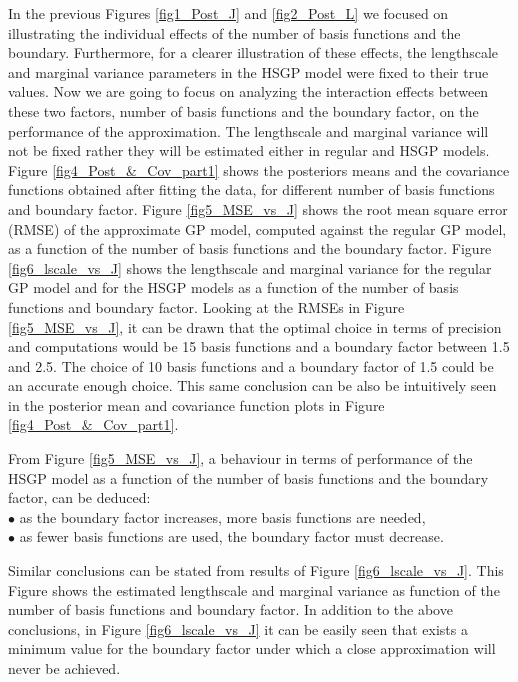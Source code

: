 \documentclass[]{interact}
\theoremstyle{plain}%
\theoremstyle{definition}
\theoremstyle{remark}
\begin{document}
In the previous Figures \ref{fig1_Post_J} and \ref{fig2_Post_L} we focused on illustrating the individual effects of the number of basis functions and the boundary. Furthermore, for a clearer illustration of these effects, the lengthscale and marginal variance parameters in the HSGP model were fixed to their true values. Now we are going to focus on analyzing the interaction effects between these two factors, number of basis functions and the boundary factor, on the performance of the approximation. The lengthscale and marginal variance will not be fixed rather they will be estimated either in regular and HSGP models.  
Figure \ref{fig4_Post_&_Cov_part1} shows the posteriors means and the covariance functions obtained after fitting the data, for different number of basis functions and boundary factor. Figure \ref{fig5_MSE_vs_J} shows the root mean square error (RMSE) of the approximate GP model, computed against the regular GP model, as a function of the number of basis functions and the boundary factor. Figure \ref{fig6_lscale_vs_J} shows the lengthscale and marginal variance for the regular GP model and for the HSGP models as a function of the number of basis functions and boundary factor. Looking at the RMSEs in Figure \ref{fig5_MSE_vs_J}, it can be drawn that the optimal choice in terms of precision and computations would be 15 basis functions and a boundary factor between 1.5 and 2.5. The choice of 10 basis functions and a boundary factor of 1.5 could be an accurate enough choice. This same conclusion can be also be intuitively seen in the posterior mean and covariance function plots in Figure \ref{fig4_Post_&_Cov_part1}.

From Figure \ref{fig5_MSE_vs_J}, a behaviour in terms of performance of the HSGP model as a function of the number of basis functions and the boundary factor, can be deduced: \\
$\bullet$ as the boundary factor increases, more basis functions are needed,
\\
$\bullet$ as fewer basis functions are used, the boundary factor must decrease. 

Similar conclusions can be stated from results of Figure \ref{fig6_lscale_vs_J}. This Figure shows the estimated lengthscale and marginal variance as function of the number of basis functions and boundary factor. In addition to the above conclusions, in Figure \ref{fig6_lscale_vs_J} it can be easily seen that exists a minimum value for the boundary factor under which a close approximation will never be achieved. \\
\end{document}
